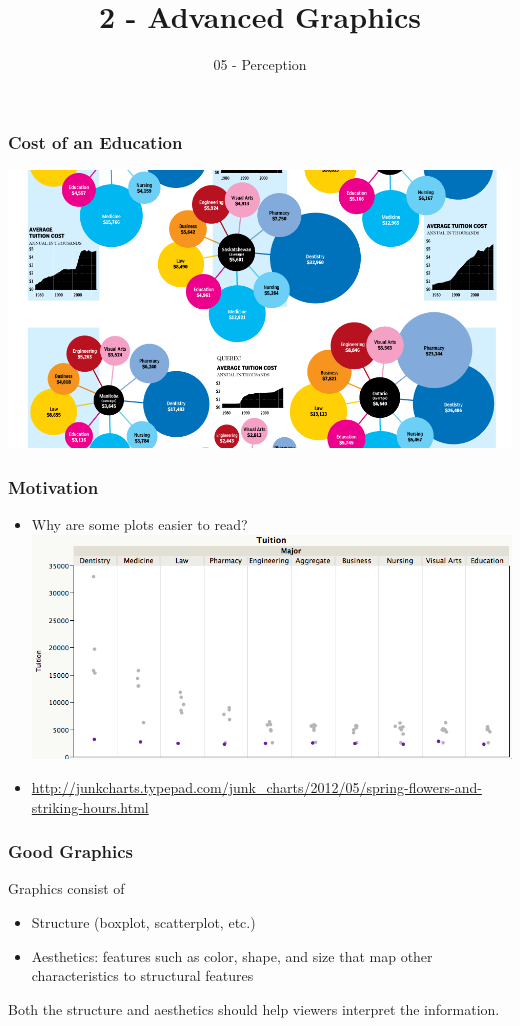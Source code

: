 \documentclass{beamer}\usepackage[]{graphicx}\usepackage[]{color}
\title[ 2-Graphics]{2 - Advanced Graphics}
\subtitle{05 - Perception}
\date{\hspace{1in}}
\institute[ISU]{Iowa State University}
\begin{document}
\begin{frame}
\maketitle
\end{frame}


\begin{frame}
    \frametitle{Cost of an Education}
\includegraphics[keepaspectratio=TRUE,width=.9\linewidth]{junkcharts.png}
\end{frame}
\begin{frame}
    \frametitle{Motivation}
    \begin{itemize}
    \item Why are some plots easier to read?
    \hspace{-24pt}\includegraphics[keepaspectratio=TRUE,width=.9\linewidth]{dotplot.png}
    \item \url{http://junkcharts.typepad.com/junk_charts/2012/05/spring-flowers-and-striking-hours.html}
    \end{itemize}
\end{frame}

\begin{frame}
\frametitle{Good Graphics}
Graphics consist of 
\begin{itemize}
\item Structure (boxplot, scatterplot, etc.)
\item Aesthetics: features such as color, shape, and size that map other characteristics to structural features
\end{itemize}\bigskip
Both the structure and aesthetics should help viewers interpret the information.
\end{frame}
\end{document}
